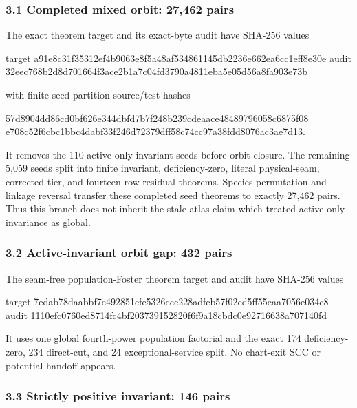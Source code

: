 \subsubsection{3.1 Completed mixed orbit: 27,462
pairs}

The exact theorem target and its exact-byte audit have SHA-256 values

\begin{CodeBlock}
target a91e8c31f35312ef4b9063e8f5a48af534861145db2236e662ea6cc1eff8e30e
audit  32eec768b2d8d701664f3ace2b1a7c04fd3790a4811eba5e05d56a8fa903e73b
\end{CodeBlock}

with finite seed-partition source/test hashes

\begin{CodeBlock}
57d8904dd86cd0bf626e344dbfd7b7f248b239cdeaace48489796058c6875f08
e708c52f6cbc1bbc4dabf33f246d72379dff58c74cc97a38fdd8076ac3ae7d13.
\end{CodeBlock}

It removes the 110 active-only invariant seeds before orbit closure. The
remaining 5,059 seeds split into finite invariant, deficiency-zero,
literal physical-seam, corrected-tier, and fourteen-row residual
theorems. Species permutation and linkage reversal transfer these
completed seed theorems to exactly 27,462 pairs. Thus this branch does
not inherit the stale atlas claim which treated active-only invariance
as global.

\subsubsection{3.2 Active-invariant orbit gap: 432
pairs}

The seam-free population-Foster theorem target and audit have SHA-256
values

\begin{CodeBlock}
target 7edab78daabbf7e492851efe5326ccc228adfcb57f02cd5ff55eaa7056e034c8
audit  1110efc0760ed8714fc4bf203739152820f6f9a18cbdc0e92716638a707140fd
\end{CodeBlock}

It uses one global fourth-power population factorial and the exact 174
deficiency-zero, 234 direct-cut, and 24 exceptional-service split. No
chart-exit SCC or potential handoff appears.

\subsubsection{3.3 Strictly positive invariant: 146
pairs}

